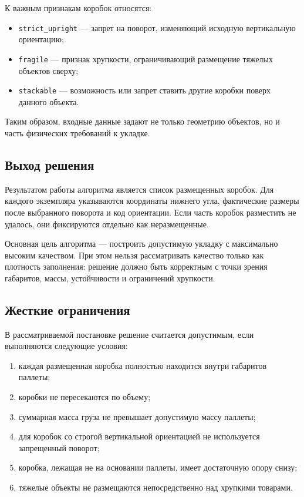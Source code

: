 \documentclass[14pt,a4paper]{extarticle}
\begin{document}
К важным признакам коробок относятся:
\begin{itemize}
  \item \texttt{strict\_upright} --- запрет на поворот, изменяющий исходную вертикальную ориентацию;
  \item \texttt{fragile} --- признак хрупкости, ограничивающий размещение тяжелых объектов сверху;
  \item \texttt{stackable} --- возможность или запрет ставить другие коробки поверх данного объекта.
\end{itemize}

Таким образом, входные данные задают не только геометрию объектов, но и часть физических требований к укладке.

\subsection{Выход решения}

Результатом работы алгоритма является список размещенных коробок. Для каждого экземпляра указываются координаты нижнего угла, фактические размеры после выбранного поворота и код ориентации. Если часть коробок разместить не удалось, они фиксируются отдельно как неразмещенные.

Основная цель алгоритма --- построить допустимую укладку с максимально высоким качеством. При этом нельзя рассматривать качество только как плотность заполнения: решение должно быть корректным с точки зрения габаритов, массы, устойчивости и ограничений хрупкости.

\subsection{Жесткие ограничения}

В рассматриваемой постановке решение считается допустимым, если выполняются следующие условия:
\begin{enumerate}
  \item каждая размещенная коробка полностью находится внутри габаритов паллеты;
  \item коробки не пересекаются по объему;
  \item суммарная масса груза не превышает допустимую массу паллеты;
  \item для коробок со строгой вертикальной ориентацией не используется запрещенный поворот;
  \item коробка, лежащая не на основании паллеты, имеет достаточную опору снизу;
  \item тяжелые объекты не размещаются непосредственно над хрупкими товарами.
\end{enumerate}
\end{document}
